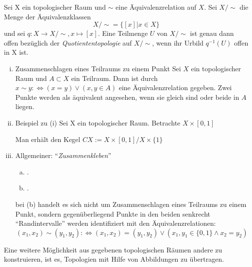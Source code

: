 \documentclass[a4paper,10pt]{scrartcl}
\renewcommand{\equiv}{\Longleftrightarrow}
\begin{document}
\begin{df}
Sei X ein topologischer Raum und $\sim$ eine Äquivalenzrelation auf $ X $.  Sei $X/\sim$ die Menge der Äquivalenzklassen 
\[
X/\sim=\{[x]|x\in X\}
\]
und sei $ q: X\to X/\sim, x\mapsto [x] $. Eine Teilmenge $ U $ von $ X/\sim $ ist genau dann offen bezüglich der \emph{Quotiententopologie} auf $ X/\sim $, wenn ihr Urbild $ q^{-1}(U) $ offen in X ist.
\end{df}

\begin{ex*}
\begin{enumerate}[(i)]
\item \begin{seg}{Zusammenschlagen eines Teilraums zu einem Punkt}
Sei $ X $ ein topologischer Raum und $ A\subset X $ ein Teilraum. Dann ist durch $ x \sim y :\equiv (x=y)\lor (x,y\in A) $ eine Äquivalenzrelation gegeben.  Zwei Punkte werden als äquivalent angesehen, wenn sie gleich sind oder beide in $ A $ liegen.
\end{seg}
\item \begin{seg}{Beispiel zu (i)}
Sei X ein topologischer Raum. Betrachte $ X\times [0,1] $
\begin{figure}[H]
\centering
 
\caption{}
\end{figure}
Man erhält den Kegel $CX:=X\times[0,1]/X\times\{1\}$
\end{seg}
\item Allgemeiner: "`\emph{Zusammenkleben}"'
\begin{enumerate}[(a)]
\item .
\begin{figure}[H]
\centering
 
\caption{}
\end{figure}
\item .
\begin{figure}[H]
\centering
 
\caption{}
\end{figure}
\end{enumerate}
bei (b) handelt es sich nicht um Zusammenschlagen eines Teilraums zu einem Punkt, sondern gegenüberliegend Punkte in den beiden senkrecht "`Randintervalle"' werden identifiziert mit den Äquivalenzrelationen: \fixme[nachschauen]
\[
(x_1,x_2)\sim (y_1,y_2):\equiv (x_1,x_2)=(y_1,y_2)\lor (x_1,y_1 \in \{0,1\} \land x_2 =y_2)
\]
\end{enumerate}
\end{ex*}
Eine weitere Möglichkeit aus gegebenen topologischen Räumen andere zu konstruieren, ist es, Topologien mit Hilfe von Abbildungen zu übertragen.
\end{document}
